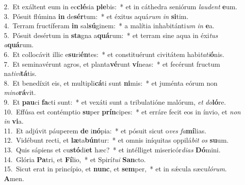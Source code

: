 {2.~}Et exáltent eum in ec\textbf{clé}sia \textbf{ple}bis:~* et in cáthedra seniórum \textit{lau}\textit{dent} \textbf{e}um.\\
{3.~}Pósuit flúmina \textbf{in} de\textbf{sér}tum:~* et éxitus aquá\textit{rum} \textit{in} \textbf{si}tim.\\
{4.~}Terram fructíferam \textbf{in} sal\textbf{sú}ginem:~* a malítia inhabitánti\textit{um} \textit{in} \textbf{e}a.\\
{5.~}Pósuit desértum in \textbf{sta}gna a\textbf{quá}rum:~* et terram sine aqua in éxi\textit{tus} \textit{a}\textbf{quá}rum.\\
{6.~}Et collocávit illic e\textbf{su}ri\textbf{én}tes:~* et constituérunt civitátem habi\textit{ta}\textit{ti}\textbf{ó}nis.\\
{7.~}Et seminavérunt agros, et planta\textbf{vé}runt \textbf{ví}neas:~* et fecérunt fructum na\textit{ti}\textit{vi}\textbf{tá}tis.\\
{8.~}Et benedíxit eis, et multipli\textbf{cá}ti sunt \textbf{ni}mis:~* et juménta eórum non \textit{mi}\textit{no}\textbf{rá}vit.\\
{9.~}Et \textbf{pau}ci \textbf{fa}cti sunt:~* et vexáti sunt a tribulatióne malórum, \textit{et} \textit{do}\textbf{ló}re.\\
{10.~}Effúsa est contémptio \textbf{su}per \textbf{prín}cipes:~* et erráre fecit eos in ínvio, et \textit{non} \textit{in} \textbf{vi}a.\\
{11.~}Et adjúvit páuperem \textbf{de} i\textbf{nó}pia:~* et pósuit sicut o\textit{ves} \textit{fa}\textbf{mí}lias.\\
{12.~}Vidébunt recti, et \textbf{læ}ta\textbf{bún}tur:~* et omnis iníquitas oppilá\textit{bit} \textit{os} \textbf{su}um.\\
{13.~}Quis sápiens et cu\textbf{stó}di\textbf{et} hæc?~* et intélliget misericór\textit{di}\textit{as} \textbf{Dó}mini.\\
{14.~}Glória \textbf{Pa}tri, et \textbf{Fí}lio,~* et Spirí\textit{tu}\textit{i} \textbf{San}cto.\\
{15.~}Sicut erat in princípio, et \textbf{nunc}, et \textbf{sem}per,~* et in sǽcula sæcu\textit{ló}\textit{rum}. \textbf{A}men.\\
